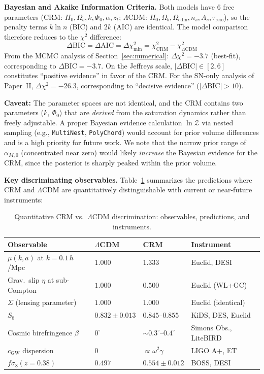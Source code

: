 \documentclass[aps,prd,twocolumn,superscriptaddress,nofootinbib]{revtex4-2}
\begin{document}
\textbf{Bayesian and Akaike Information Criteria.} Both models have 6 free parameters (CRM: $H_0, \Omega_b, k, \Phi_0, \alpha, z_t$; $\Lambda$CDM: $H_0, \Omega_b, \Omega_{\mathrm{cdm}}, n_s, A_s, \tau_{\mathrm{reio}}$), so the penalty terms $k \ln n$ (BIC) and $2k$ (AIC) are identical. The model comparison therefore reduces to the $\chi^2$ difference:
\begin{equation}
\Delta\mathrm{BIC} = \Delta\mathrm{AIC} = \Delta\chi^2_{\mathrm{min}} = \chi^2_{\mathrm{CRM}} - \chi^2_{\Lambda\mathrm{CDM}}
\end{equation}
From the MCMC analysis of Section~\ref{sec:numerical}: $\Delta\chi^2 = -3.7$ (best-fit), corresponding to $\Delta\mathrm{BIC} = -3.7$. On the Jeffreys scale, $|\Delta\mathrm{BIC}| \in [2, 6]$ constitutes ``positive evidence'' in favor of the CRM. For the SN-only analysis of Paper~II, $\Delta\chi^2 = -26.3$, corresponding to ``decisive evidence'' ($|\Delta\mathrm{BIC}| > 10$).

\textbf{Caveat:} The parameter spaces are not identical, and the CRM contains two parameters ($k$, $\Phi_0$) that are \textit{derived} from the saturation dynamics rather than freely adjustable. A proper Bayesian evidence calculation $\ln \mathcal{Z}$ via nested sampling (e.g., \texttt{MultiNest}, \texttt{PolyChord}) would account for prior volume differences and is a high priority for future work. We note that the narrow prior range of $\alpha_{M,0}$ (concentrated near zero) would likely \textit{increase} the Bayesian evidence for the CRM, since the posterior is sharply peaked within the prior volume.

\textbf{Key discriminating observables.} Table~\ref{tab:cfm_lcdm_disc} summarizes the predictions where CRM and $\Lambda$CDM are quantitatively distinguishable with current or near-future instruments:

\begin{table}
\centering
\caption{Quantitative CRM vs.\ $\Lambda$CDM discrimination: observables, predictions, and instruments.}
\label{tab:cfm_lcdm_disc}
\begin{tabular}{llll}
\toprule
\textbf{Observable} & \textbf{$\Lambda$CDM} & \textbf{CRM} & \textbf{Instrument} \\
\midrule
$\mu(k,a)$ at $k = 0.1\,h$/Mpc & $1.000$ & $1.333$ & Euclid, DESI \\
Grav.\ slip $\eta$ at sub-Compton & $1.000$ & $0.500$ & Euclid (WL+GC) \\
$\Sigma$ (lensing parameter) & $1.000$ & $1.000$ & Euclid (identical) \\
$S_8$ & $0.832 \pm 0.013$ & $0.845$--$0.855$ & KiDS, DES, Euclid \\
Cosmic birefringence $\beta$ & $0^\circ$ & $\sim 0.3^\circ$--$0.4^\circ$ & Simons Obs., LiteBIRD \\
$c_{\mathrm{GW}}$ dispersion & $0$ & $\propto \omega^2 \gamma$ & LIGO A+, ET \\
$f\sigma_8(z = 0.38)$ & $0.497$ & $0.554 \pm 0.012$ & BOSS, DESI \\
\bottomrule
\end{tabular}
\end{table}
\end{document}
